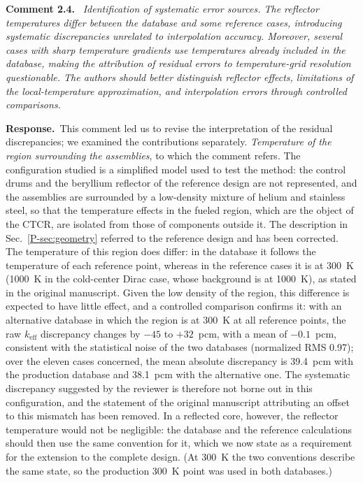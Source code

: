 \documentclass[11pt]{article}
\newenvironment{revcomment}[1]
  {\par\medskip\noindent\textbf{Comment #1.}\ \itshape}
  {\par}
\newcommand{\response}{\par\noindent\textbf{Response.}\ }
\begin{document}
\begin{revcomment}{2.4}
Identification of systematic error sources. The reflector temperatures differ between the database and some reference cases, introducing systematic discrepancies unrelated to interpolation accuracy. Moreover, several cases with sharp temperature gradients use temperatures already included in the database, making the attribution of residual errors to temperature-grid resolution questionable. The authors should better distinguish reflector effects, limitations of the local-temperature approximation, and interpolation errors through controlled comparisons.
\end{revcomment}
\response This comment led us to revise the interpretation of the residual discrepancies; we examined the contributions separately.
\emph{Temperature of the region surrounding the assemblies}, to which the comment refers. The configuration studied is a simplified model used to test the method: the control drums and the beryllium reflector of the reference design are not represented, and the assemblies are surrounded by a low-density mixture of helium and stainless steel, so that the temperature effects in the fueled region, which are the object of the CTCR, are isolated from those of components outside it. The description in Sec.~\ref{P-sec:geometry} referred to the reference design and has been corrected. The temperature of this region does differ: in the database it follows the temperature of each reference point, whereas in the reference cases it is at 300~K (1000~K in the cold-center Dirac case, whose background is at 1000~K), as stated in the original manuscript. Given the low density of the region, this difference is expected to have little effect, and a controlled comparison confirms it: with an alternative database in which the region is at 300~K at all reference points, the raw $k_{\text{eff}}$ discrepancy changes by $-45$ to $+32$~pcm, with a mean of $-0.1$~pcm, consistent with the statistical noise of the two databases (normalized RMS 0.97); over the eleven cases concerned, the mean absolute discrepancy is 39.4~pcm with the production database and 38.1~pcm with the alternative one. The systematic discrepancy suggested by the reviewer is therefore not borne out in this configuration, and the statement of the original manuscript attributing an offset to this mismatch has been removed. In a reflected core, however, the reflector temperature would not be negligible: the database and the reference calculations should then use the same convention for it, which we now state as a requirement for the extension to the complete design. (At 300~K the two conventions describe the same state, so the production 300~K point was used in both databases.)
\end{document}
